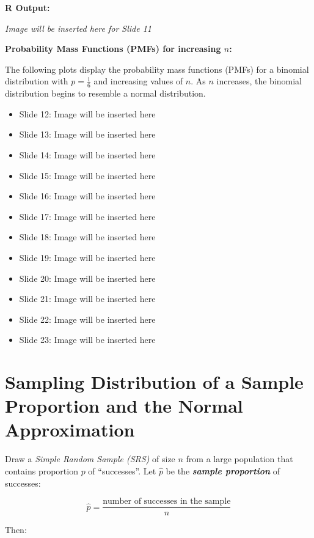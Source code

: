 \textbf{R Output:}


\begin{center}
\textit{Image will be inserted here for Slide 11}
\end{center}

\textbf{Probability Mass Functions (PMFs) for increasing \(n\):}

\vspace{0.5em}

The following plots display the probability mass functions (PMFs) for a binomial distribution with \( p = \frac{1}{6} \) and increasing values of \( n \). As \( n \) increases, the binomial distribution begins to resemble a normal distribution.

\begin{itemize}
  \item Slide 12: Image will be inserted here
  \item Slide 13: Image will be inserted here
  \item Slide 14: Image will be inserted here
  \item Slide 15: Image will be inserted here
  \item Slide 16: Image will be inserted here
  \item Slide 17: Image will be inserted here
  \item Slide 18: Image will be inserted here
  \item Slide 19: Image will be inserted here
  \item Slide 20: Image will be inserted here
  \item Slide 21: Image will be inserted here
  \item Slide 22: Image will be inserted here
  \item Slide 23: Image will be inserted here
\end{itemize}

\section{Sampling Distribution of a Sample Proportion and the Normal Approximation}

Draw a \textit{Simple Random Sample (SRS)} of size \( n \) from a large population that contains proportion \( p \) of “successes”. Let \( \hat{p} \) be the \textbf{\textit{sample proportion}} of successes:

\[
\hat{p} = \frac{\text{number of successes in the sample}}{n}
\]

Then:

